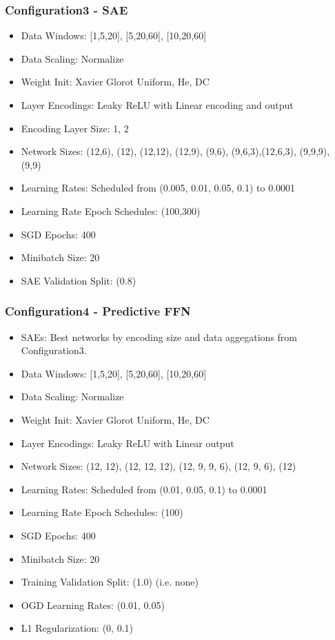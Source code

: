 \documentclass[a4paper,11pt,oneside]{article}
\theoremstyle{plain}
\theoremstyle{definition}
\begin{document}
\subsubsection{Configuration3 - SAE}\label{config3}
\begin{itemize}
	\item Data Windows: [1,5,20], [5,20,60], [10,20,60]
	\item Data Scaling: Normalize
	\item Weight Init: Xavier Glorot Uniform, He, DC
	\item Layer Encodings: Leaky ReLU with Linear encoding and output
	\item Encoding Layer Size: 1, 2
	\item Network Sizes: (12,6), (12), (12,12), (12,9), (9,6), (9,6,3),(12,6,3), (9,9,9), (9,9)
	\item Learning Rates: Scheduled from (0.005, 0.01, 0.05, 0.1) to 0.0001
	\item Learning Rate Epoch Schedules: (100,300)
	\item SGD Epochs: 400
	\item Minibatch Size: 20
	\item SAE Validation Split: (0.8)
\end{itemize}
	
\subsubsection{Configuration4 - Predictive FFN}\label{config4}
\begin{itemize}
	\item SAEs: Best networks by encoding size and data aggegations from Configuration3.
	\item Data Windows: [1,5,20], [5,20,60], [10,20,60]
	\item Data Scaling: Normalize
	\item Weight Init: Xavier Glorot Uniform, He, DC
	\item Layer Encodings: Leaky ReLU with Linear output
	\item Network Sizes: (12, 12), (12, 12, 12), (12, 9, 9, 6), (12, 9, 6), (12)
	\item Learning Rates: Scheduled from (0.01, 0.05, 0.1) to 0.0001
	\item Learning Rate Epoch Schedules: (100)
	\item SGD Epochs: 400
	\item Minibatch Size: 20
	\item Training Validation Split: (1.0) (i.e. none)
	\item OGD Learning Rates: (0.01, 0.05)
	\item L1 Regularization: (0, 0.1)
\end{itemize}
\end{document}
